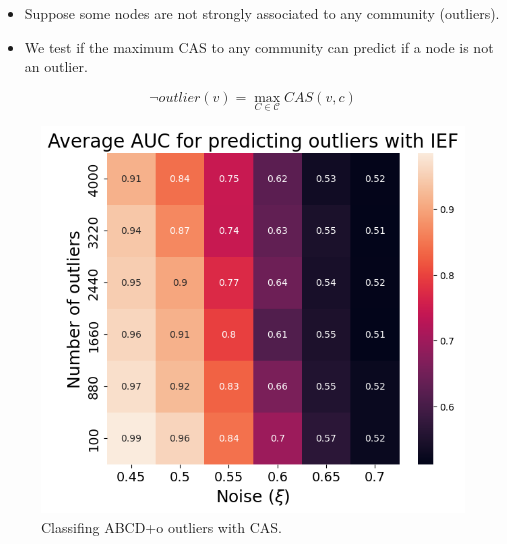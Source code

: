 \documentclass{beamer}
\begin{document}
\begin{frame}{}
    \begin{itemize}
        \color{darkblue}
        \item Suppose some nodes are not strongly associated to any community (outliers).
        \item We test if the maximum CAS to any community can predict if a node is not an outlier.
    \end{itemize}
    $$\lnot outlier(v) = \max_{C\in \mathcal{C}} CAS(v,c)$$
\end{frame}
\begin{frame}{}
    \begin{figure}
        \includegraphics[height=0.75\textheight]{figures/outlier-auc-ief.png}
        \caption{Classifing ABCD+o outliers with CAS.}
    \end{figure}
\end{frame}
\end{document}
